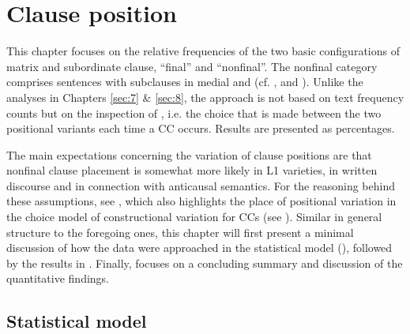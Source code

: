 \chapter{Clause position}\label{ch:9}\label{bkm:Ref3391695}\label{bkm:Ref4146297}\label{sec:9}

This chapter focuses on the relative frequencies of the two basic configurations of matrix and subordinate clause, “final” and “nonfinal”. The nonfinal category comprises sentences with subclauses in medial and  (cf. ,  and ). Unlike the analyses in Chapters \ref{sec:7} \& \ref{sec:8}, the approach is not based on text frequency counts but on the inspection of , i.e. the choice that is made between the two positional variants each time a CC occurs. Results are presented as percentages.

The main expectations concerning the variation of clause positions are that nonfinal clause placement is somewhat more likely in L1 varieties, in written discourse and in connection with anticausal semantics. For the reasoning behind these assumptions, see , which also highlights the place of positional variation in the choice model of constructional variation for CCs (see ). Similar in general structure to the foregoing ones, this chapter will first present a minimal discussion of how the data were approached in the statistical model (), followed by the results in . Finally,  focuses on a concluding summary and discussion of the quantitative findings.

\section{\label{bkm:Ref52571821}\label{bkm:Ref52609859}Statistical model}\label{sec:9.1}

